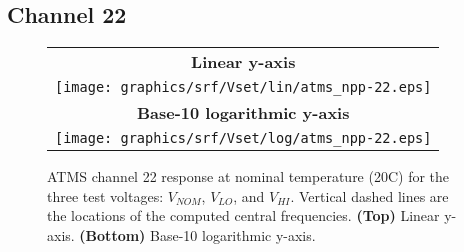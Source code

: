 \subsection{Channel 22}
\begin{figure}[H]
  \label{fig:Vset.ch22_response}
  \centering
  \begin{tabular}{c}
    \hspace{0.75cm}\sffamily\textbf{Linear y-axis} \\
    \texttt{[image: graphics/srf/Vset/lin/atms\_npp-22.eps]} \\
    \hspace{0.75cm}\sffamily\textbf{Base-10 logarithmic y-axis} \\
    \texttt{[image: graphics/srf/Vset/log/atms\_npp-22.eps]}
  \end{tabular}
  \caption{ATMS channel 22 response at nominal temperature (20\textdegree{}C) for the three test voltages: $V_{NOM}$, $V_{LO}$, and $V_{HI}$. Vertical dashed lines are the locations of the computed central frequencies. \textbf{(Top)} Linear y-axis. \textbf{(Bottom)} Base-10 logarithmic y-axis.}
\end{figure}
